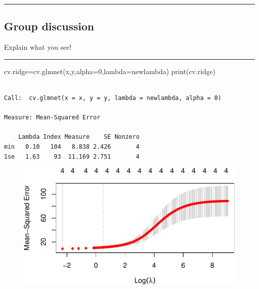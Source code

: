 \documentclass[
  letterpaper,
  DIV=11,
  numbers=noendperiod]{scrartcl}
\newenvironment{Shaded}{\begin{snugshade}}{\end{snugshade}}
\newcommand{\AttributeTok}[1]{\textcolor[rgb]{0.40,0.45,0.13}{#1}}
\newcommand{\CommentTok}[1]{\textcolor[rgb]{0.37,0.37,0.37}{#1}}
\newcommand{\DecValTok}[1]{\textcolor[rgb]{0.68,0.00,0.00}{#1}}
\newcommand{\FunctionTok}[1]{\textcolor[rgb]{0.28,0.35,0.67}{#1}}
\newcommand{\NormalTok}[1]{\textcolor[rgb]{0.00,0.23,0.31}{#1}}
\newcommand{\OtherTok}[1]{\textcolor[rgb]{0.00,0.23,0.31}{#1}}
\begin{document}
\begin{center}\rule{0.5\linewidth}{0.5pt}\end{center}

\hypertarget{group-discussion-1}{%
\subsection{Group discussion}\label{group-discussion-1}}

Explain what you see!

\begin{center}\rule{0.5\linewidth}{0.5pt}\end{center}

\begin{Shaded}
\begin{Highlighting}[]
\NormalTok{cv.ridge}\OtherTok{=}\FunctionTok{cv.glmnet}\NormalTok{(x,y,}\AttributeTok{alpha=}\DecValTok{0}\NormalTok{,}\AttributeTok{lambda=}\NormalTok{newlambda)}
\FunctionTok{print}\NormalTok{(cv.ridge)}
\end{Highlighting}
\end{Shaded}

\begin{verbatim}

Call:  cv.glmnet(x = x, y = y, lambda = newlambda, alpha = 0) 

Measure: Mean-Squared Error 

    Lambda Index Measure    SE Nonzero
min   0.10   104   8.838 2.426       4
1se   1.63    93  11.169 2.751       4
\end{verbatim}

\begin{Shaded}
\end{Shaded}

\begin{figure}[H]

{\centering \includegraphics{L7_files/figure-pdf/unnamed-chunk-14-1.pdf}

}

\end{figure}
\end{document}
